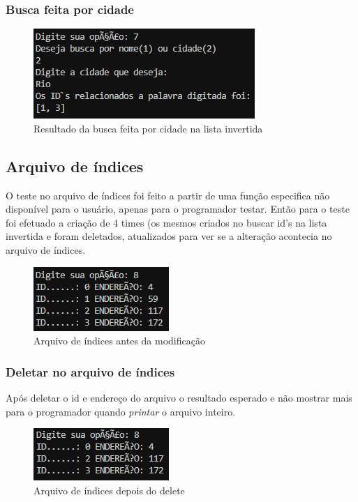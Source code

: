 \documentclass[12pt]{article}
\begin{document}
\subsubsection{Busca feita por cidade}

\begin{figure}[ht]
\centering
\includegraphics[width=.6\textwidth]{busca_cidade.png}
\caption{Resultado da busca feita por cidade na lista invertida}
\label{fig:att_arq}
\end{figure}

\subsection{Arquivo de índices}
O teste no arquivo de índices foi feito a partir de uma função especifica não disponível para o usuário, apenas para o programador testar. Então para o teste foi efetuado a criação de 4 times (os mesmos criados no buscar id's na lista invertida e foram deletados, atualizados para ver se a alteração acontecia no arquivo de índices.

\begin{figure}[ht]
\centering
\includegraphics[width=.4\textwidth]{arquivo_antes_delete.png}
\caption{Arquivo de índices antes da modificação}
\label{fig:att_arq}
\end{figure}

\newpage
\subsubsection{Deletar no arquivo de índices}
Após deletar o id e endereço do arquivo o resultado esperado e não mostrar mais para o programador quando \textit{printar} o arquivo inteiro.

\begin{figure}[ht]
\centering
\includegraphics[width=.4\textwidth]{arquivo_depois_delete.png}
\caption{Arquivo de índices depois do delete}
\label{fig:att_arq}
\end{figure}
\end{document}
